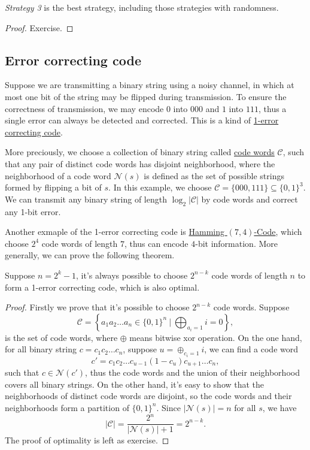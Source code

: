 \documentclass{scribe}
\begin{document}
\begin{theorem}
  \textit{Strategy 3} is the best strategy, including those strategies with randomness.   
\end{theorem}
\begin{proof}
  Exercise.
\end{proof}

\subsection{Error correcting code}
\label{sec:ecc}

Suppose we are transmitting a binary string using a noisy channel, in which at most one bit of the string may be flipped during transmission. To ensure the correctness of transmission, we may encode $0$ into $000$ and $1$ into $111$, thus a single error can always be detected and corrected. This is a kind of \ul{1-error correcting code}.

More preciously, we choose a collection of binary string called \ul{code words} $\mathcal{C}$, such that any pair of distinct code words has disjoint neighborhood, where the neighborhood of a code word $\mathcal{N}(s)$ is defined as the set of possible strings formed by flipping a bit of $s$. In this example, we choose $\mathcal{C} = \{000, 111\}\subseteq\{0, 1\}^3$. We can transmit any binary string of length $\log_2|\mathcal{C}|$ by code words and correct any 1-bit error.

Another exmaple of the 1-error correcting code is \ul{Hamming $(7, 4)$-Code}, which choose $2^4$ code words of length $7$, thus can encode $4$-bit information. More generally, we can prove the following theorem.

\begin{theorem}
  \label{thm:hamming-exists}
  Suppose $n=2^k-1$, it's always possible to choose $2^{n-k}$ code words of length $n$ to form a 1-error correcting code, which is also optimal.   
\end{theorem}
\begin{proof}
  Firstly we prove that it's possible to choose $2^{n-k}$ code words. Suppose
  \[
    \mathcal{C} = \left\{a_1a_2\dots a_n\in \{0,1\}^n~\Big|~\bigoplus_{a_i = 1}i = 0\right\},
  \]
  is the set of code words, where $\oplus$ means bitwise xor operation. On the one hand, for all binary string $c = c_1c_2\dots c_n$, suppose $u = \oplus_{c_i=1}i$, we can find a code word
  \[c' = c_1c_2\dots c_{u-1}(1-c_u)c_{u+1}\dots c_n,\]
  such that $c\in \mathcal{N}(c')$, thus the code words and the union of their neighborhood covers all binary strings. On the other hand, it's easy to show that the neighborhoods of distinct code words are disjoint, so the code words and their neighborhoods form a partition of $\{0, 1\}^n$. Since $|\mathcal{N}(s)| = n$ for all $s$, we have
  \[ 
    |\mathcal{C}| = \frac{2^n}{|\mathcal{N}(s)| + 1} = 2^{n-k}.
  \]
  The proof of optimality is left as exercise.
\end{proof}
\end{document}
